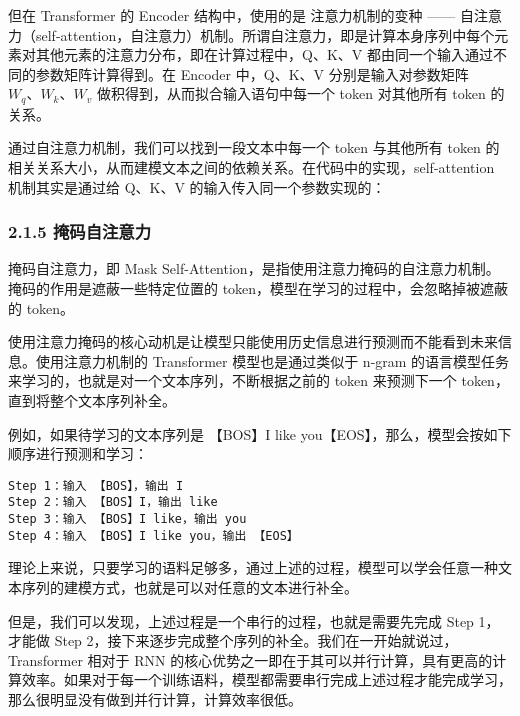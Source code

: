 \documentclass[12pt,a4paper]{book}
\begin{document}
\hspace{0pt}但在 Transformer 的 Encoder 结构中，使用的是
注意力机制的变种 ------
自注意力（self-attention，自注意力）机制。所谓自注意力，即是计算本身序列中每个元素对其他元素的注意力分布，即在计算过程中，Q、K、V
都由同一个输入通过不同的参数矩阵计算得到。在 Encoder 中，Q、K、V
分别是输入对参数矩阵 \(W_q、W_k、W_v\)
做积得到，从而拟合输入语句中每一个 token 对其他所有 token 的关系。

通过自注意力机制，我们可以找到一段文本中每一个 token 与其他所有 token
的相关关系大小，从而建模文本之间的依赖关系。\hspace{0pt}在代码中的实现，self-attention
机制其实是通过给 Q、K、V 的输入传入同一个参数实现的：

\begin{Shaded}
\begin{Highlighting}[]
\end{Highlighting}
\end{Shaded}

\subsubsection{2.1.5
掩码自注意力}\label{ux63a9ux7801ux81eaux6ce8ux610fux529b}

掩码自注意力，即 Mask
Self-Attention，是指使用注意力掩码的自注意力机制。掩码的作用是遮蔽一些特定位置的
token，模型在学习的过程中，会忽略掉被遮蔽的 token。

使用注意力掩码的核心动机是让模型只能使用历史信息进行预测而不能看到未来信息。使用注意力机制的
Transformer 模型也是通过类似于 n-gram
的语言模型任务来学习的，也就是对一个文本序列，不断根据之前的 token
来预测下一个 token，直到将整个文本序列补全。

例如，如果待学习的文本序列是 【BOS】I like
you【EOS】，那么，模型会按如下顺序进行预测和学习：

\begin{verbatim}
Step 1：输入 【BOS】，输出 I
Step 2：输入 【BOS】I，输出 like
Step 3：输入 【BOS】I like，输出 you
Step 4：输入 【BOS】I like you，输出 【EOS】
\end{verbatim}

理论上来说，只要学习的语料足够多，通过上述的过程，模型可以学会任意一种文本序列的建模方式，也就是可以对任意的文本进行补全。

但是，我们可以发现，上述过程是一个串行的过程，也就是需要先完成 Step
1，才能做 Step
2，接下来逐步完成整个序列的补全。我们在一开始就说过，Transformer 相对于
RNN
的核心优势之一即在于其可以并行计算，具有更高的计算效率。如果对于每一个训练语料，模型都需要串行完成上述过程才能完成学习，那么很明显没有做到并行计算，计算效率很低。
\end{document}
